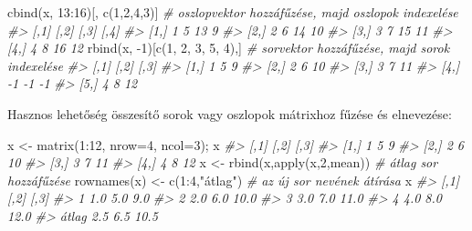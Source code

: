 \documentclass[
]{book}
\newenvironment{Shaded}{\begin{snugshade}}{\end{snugshade}}
\newcommand{\AttributeTok}[1]{\textcolor[rgb]{0.77,0.63,0.00}{#1}}
\newcommand{\CommentTok}[1]{\textcolor[rgb]{0.56,0.35,0.01}{\textit{#1}}}
\newcommand{\DecValTok}[1]{\textcolor[rgb]{0.00,0.00,0.81}{#1}}
\newcommand{\FunctionTok}[1]{\textcolor[rgb]{0.00,0.00,0.00}{#1}}
\newcommand{\NormalTok}[1]{#1}
\newcommand{\OtherTok}[1]{\textcolor[rgb]{0.56,0.35,0.01}{#1}}
\newcommand{\SpecialCharTok}[1]{\textcolor[rgb]{0.00,0.00,0.00}{#1}}
\newcommand{\StringTok}[1]{\textcolor[rgb]{0.31,0.60,0.02}{#1}}
\begin{document}
\begin{Shaded}
\begin{Highlighting}[]
\FunctionTok{cbind}\NormalTok{(x, }\DecValTok{13}\SpecialCharTok{:}\DecValTok{16}\NormalTok{)[, }\FunctionTok{c}\NormalTok{(}\DecValTok{1}\NormalTok{,}\DecValTok{2}\NormalTok{,}\DecValTok{4}\NormalTok{,}\DecValTok{3}\NormalTok{)]   }\CommentTok{\# oszlopvektor hozzáfűzése, majd oszlopok indexelése}
\CommentTok{\#\textgreater{}      [,1] [,2] [,3] [,4]}
\CommentTok{\#\textgreater{} [1,]    1    5   13    9}
\CommentTok{\#\textgreater{} [2,]    2    6   14   10}
\CommentTok{\#\textgreater{} [3,]    3    7   15   11}
\CommentTok{\#\textgreater{} [4,]    4    8   16   12}
\FunctionTok{rbind}\NormalTok{(x, }\SpecialCharTok{{-}}\DecValTok{1}\NormalTok{)[}\FunctionTok{c}\NormalTok{(}\DecValTok{1}\NormalTok{, }\DecValTok{2}\NormalTok{, }\DecValTok{3}\NormalTok{, }\DecValTok{5}\NormalTok{, }\DecValTok{4}\NormalTok{),] }\CommentTok{\# sorvektor hozzáfűzése, majd sorok indexelése}
\CommentTok{\#\textgreater{}      [,1] [,2] [,3]}
\CommentTok{\#\textgreater{} [1,]    1    5    9}
\CommentTok{\#\textgreater{} [2,]    2    6   10}
\CommentTok{\#\textgreater{} [3,]    3    7   11}
\CommentTok{\#\textgreater{} [4,]   {-}1   {-}1   {-}1}
\CommentTok{\#\textgreater{} [5,]    4    8   12}
\end{Highlighting}
\end{Shaded}

Hasznos lehetőség összesítő sorok vagy oszlopok mátrixhoz fűzése és elnevezése:

\begin{Shaded}
\begin{Highlighting}[]
\NormalTok{x }\OtherTok{\textless{}{-}} \FunctionTok{matrix}\NormalTok{(}\DecValTok{1}\SpecialCharTok{:}\DecValTok{12}\NormalTok{, }\AttributeTok{nrow=}\DecValTok{4}\NormalTok{, }\AttributeTok{ncol=}\DecValTok{3}\NormalTok{); x}
\CommentTok{\#\textgreater{}      [,1] [,2] [,3]}
\CommentTok{\#\textgreater{} [1,]    1    5    9}
\CommentTok{\#\textgreater{} [2,]    2    6   10}
\CommentTok{\#\textgreater{} [3,]    3    7   11}
\CommentTok{\#\textgreater{} [4,]    4    8   12}
\NormalTok{x }\OtherTok{\textless{}{-}} \FunctionTok{rbind}\NormalTok{(x,}\FunctionTok{apply}\NormalTok{(x,}\DecValTok{2}\NormalTok{,mean))  }\CommentTok{\# átlag sor hozzáfűzése}
\FunctionTok{rownames}\NormalTok{(x) }\OtherTok{\textless{}{-}} \FunctionTok{c}\NormalTok{(}\DecValTok{1}\SpecialCharTok{:}\DecValTok{4}\NormalTok{,}\StringTok{"átlag"}\NormalTok{)  }\CommentTok{\# az új sor nevének átírása}
\NormalTok{x}
\CommentTok{\#\textgreater{}       [,1] [,2] [,3]}
\CommentTok{\#\textgreater{} 1      1.0  5.0  9.0}
\CommentTok{\#\textgreater{} 2      2.0  6.0 10.0}
\CommentTok{\#\textgreater{} 3      3.0  7.0 11.0}
\CommentTok{\#\textgreater{} 4      4.0  8.0 12.0}
\CommentTok{\#\textgreater{} átlag  2.5  6.5 10.5}
\end{Highlighting}
\end{Shaded}
\end{document}

